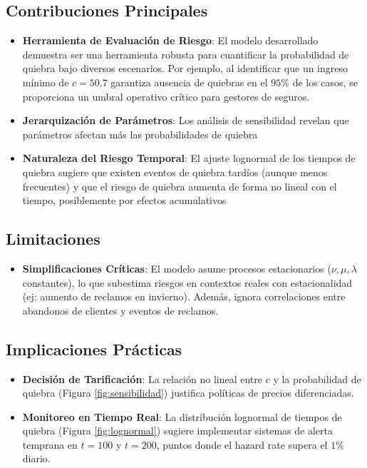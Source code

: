 \documentclass{article}
\begin{document}
\subsection{Contribuciones Principales}
\begin{itemize}
    \item \textbf{Herramienta de Evaluación de Riesgo}: 
    El modelo desarrollado demuestra ser una herramienta robusta para cuantificar la probabilidad de quiebra bajo diversos escenarios. Por ejemplo, al identificar que un ingreso mínimo de \( c = 50.7 \) garantiza ausencia de quiebras en el \( 95\% \) de los casos, se proporciona un umbral operativo crítico para gestores de seguros.

    \item \textbf{Jerarquización de Parámetros}: 
    Los análisis de sensibilidad revelan que parámetros afectan más las probabilidades de quiebra

    \item \textbf{Naturaleza del Riesgo Temporal}: 
    El ajuste lognormal de los tiempos de quiebra sugiere que existen eventos de quiebra tardíos (aunque menos frecuentes) y que el riesgo de quiebra aumenta de forma no lineal con el tiempo, posiblemente por efectos acumulativos
\end{itemize}

\subsection{Limitaciones}
\begin{itemize}
    \item \textbf{Simplificaciones Críticas}: 
    El modelo asume procesos estacionarios (\( \nu, \mu, \lambda \) constantes), lo que subestima riesgos en contextos reales con estacionalidad (ej: aumento de reclamos en invierno). Además, ignora correlaciones entre abandonos de clientes y eventos de reclamos.
\end{itemize}

\subsection{Implicaciones Prácticas}
\begin{itemize}
    \item \textbf{Decisión de Tarificación}: 
    La relación no lineal entre \( c \) y la probabilidad de quiebra (Figura \ref{fig:sensibilidad}) justifica políticas de precios diferenciadas.

    \item \textbf{Monitoreo en Tiempo Real}: 
    La distribución lognormal de tiempos de quiebra (Figura \ref{fig:lognormal}) sugiere implementar sistemas de alerta temprana en \( t = 100 \) y \( t = 200 \), puntos donde el hazard rate supera el \( 1\% \) diario.
\end{itemize}
\end{document}
